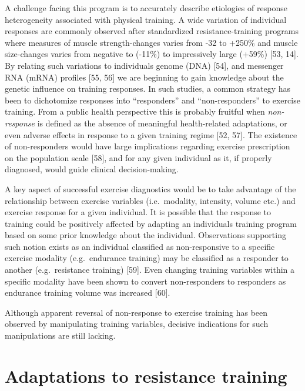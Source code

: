 \documentclass[twoside,10pt]{gihclass} %
\begin{document}
A challenge facing this program is to accurately describe etiologies of response heterogeneity associated with physical training. A wide variation of individual responses are commonly observed after standardized resistance-training programs where measures of muscle strength-changes varies from -32 to +250\% and muscle size-changes varies from negative to (-11\%) to impressively large (+59\%)
{[}53, 14{]}.
By relating such variations to individuals genome (DNA)
{[}54{]},
and messenger RNA (mRNA) profiles
{[}55, 56{]}
we are beginning to gain knowledge about the genetic influence on training responses.
In such studies, a common strategy has been to dichotomize responses into ``responders'' and ``non-responders'' to exercise training. From a public health perspective this is probably fruitful when \emph{non-response} is defined as the absence of meaningful health-related adaptations, or even adverse effects in response to a given training regime
{[}52, 57{]}.
The existence of non-responders would have large implications regarding exercise prescription on the population scale
{[}58{]},
and for any given individual as it, if properly diagnosed, would guide clinical decision-making.

A key aspect of successful exercise diagnostics would be to take advantage of the relationship between exercise variables (i.e.~modality, intensity, volume etc.) and exercise response for a given individual.
It is possible that the response to training could be positively affected by adapting an individuals training program based on some prior knowledge about the individual.
Observations supporting such notion exists as an individual classified as non-responsive to a specific exercise modality (e.g.~endurance training) may be classified as a responder to another (e.g.~resistance training)
{[}59{]}.
Even changing training variables within a specific modality have been shown to convert non-responders to responders as endurance training volume was increased
{[}60{]}.

Although apparent reversal of non-response to exercise training has been observed by manipulating training variables, decisive indications for such manipulations are still lacking.

\hypertarget{adaptations-to-resistance-training}{%
\section{Adaptations to resistance training}\label{adaptations-to-resistance-training}}
\end{document}
